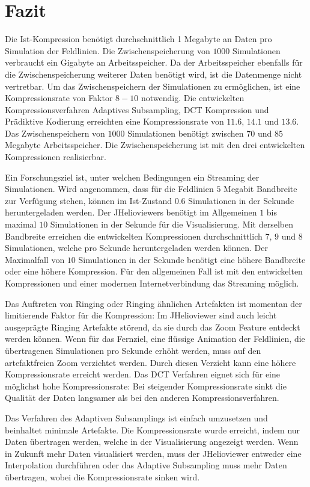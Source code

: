 \section{Fazit}
Die Ist-Kompression benötigt durchschnittlich 1 Megabyte an Daten pro Simulation der Feldlinien. Die Zwischenspeicherung von $1000$ Simulationen verbraucht ein Gigabyte an Arbeitsspeicher. Da der Arbeitsspeicher ebenfalls für die Zwischenspeicherung weiterer Daten benötigt wird, ist die Datenmenge nicht vertretbar. Um das Zwischenspeichern der Simulationen zu ermöglichen, ist eine Kompressionsrate von Faktor $8-10$ notwendig. Die entwickelten Kompressionsverfahren Adaptives Subsampling, DCT Kompression und Prädiktive Kodierung erreichten eine Kompressionsrate von $11.6$, $14.1$ und $13.6$. Das Zwischenspeichern von $1000$ Simulationen benötigt zwischen $70$ und $85$ Megabyte Arbeitsspeicher. Die Zwischenspeicherung ist mit den drei entwickelten Kompressionen realisierbar.

Ein Forschungsziel ist, unter welchen Bedingungen ein Streaming der Simulationen. Wird angenommen, dass für die Feldlinien $5$ Megabit Bandbreite zur Verfügung stehen, können im Ist-Zustand $0.6$ Simulationen in der Sekunde heruntergeladen werden. Der JHelioviewers benötigt im Allgemeinen $1$ bis maximal $10$ Simulationen in der Sekunde für die Visualisierung. Mit derselben Bandbreite erreichen die entwickelten Kompressionen durchschnittlich $7$, $9$ und $8$ Simulationen, welche pro Sekunde heruntergeladen werden können. Der Maximalfall von $10$ Simulationen in der Sekunde benötigt eine höhere Bandbreite oder eine höhere Kompression. Für den allgemeinen Fall ist mit den entwickelten Kompressionen und einer modernen Internetverbindung das Streaming möglich. 

Das Auftreten von Ringing oder Ringing ähnlichen Artefakten ist momentan der limitierende Faktor für die Kompression: Im JHelioviewer sind auch leicht ausgeprägte Ringing Artefakte störend, da sie durch das Zoom Feature entdeckt werden können. Wenn für das Fernziel, eine flüssige Animation der Feldlinien, die übertragenen Simulationen pro Sekunde erhöht werden, muss auf den artefaktfreien Zoom verzichtet werden. Durch diesen Verzicht kann eine höhere Kompressionsrate erreicht werden. Das DCT Verfahren eignet sich für eine möglichst hohe Kompressionsrate: Bei steigender Kompressionsrate sinkt die Qualität der Daten langsamer als bei den anderen Kompressionsverfahren.

Das Verfahren des Adaptiven Subsamplings ist einfach umzusetzen und beinhaltet minimale Artefakte. Die Kompressionsrate wurde erreicht, indem nur Daten übertragen werden, welche in der Visualisierung angezeigt werden. Wenn in Zukunft mehr Daten visualisiert werden, muss der JHelioviewer entweder eine Interpolation durchführen oder das Adaptive Subsampling muss mehr Daten übertragen, wobei die Kompressionsrate sinken wird.

